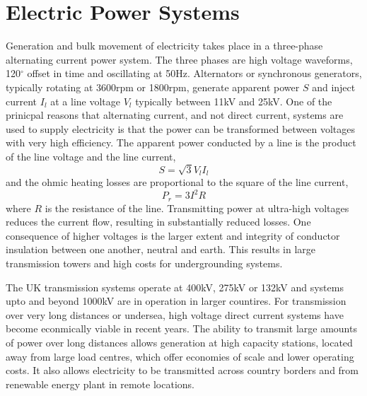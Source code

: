 \section{Electric Power Systems}
Generation and bulk movement of electricity takes place in a three-phase
alternating current power system.  The three phases are high voltage waveforms,
120$^\circ$ offset in time and oscillating at 50Hz.  Alternators or synchronous
generators, typically rotating at 3600rpm or 1800rpm, generate apparent power
$S$ and inject current $I_l$ at a line voltage $V_l$ typically between 11kV and
25kV.  One of the prinicpal reasons that alternating current, and not direct
current, systems are used to supply electricity is that the power can be
transformed between voltages with very high efficiency.  The apparent power
conducted by a line is the product of the line voltage and the line current,
\begin{equation}
S = \sqrt{3} V_l I_l
\end{equation}
and the ohmic heating losses are proportional to the square of the line
current,
\begin{equation}
P_{r} = 3 I^2 R
\end{equation}
where $R$ is the resistance of the line.  Transmitting power at ultra-high
voltages reduces the current flow, resulting in substantially reduced losses.
One consequence of higher voltages is the larger extent and integrity
of conductor insulation between one another, neutral and earth.  This results
in large transmission towers and high costs for undergrounding systems.

The UK transmission systems operate at 400kV, 275kV or 132kV and systems upto
and beyond 1000kV are in operation in larger countires.  For transmission over
very long distances or undersea, high voltage direct current systems have
become econmically viable in recent years.  The ability to transmit large
amounts of power over long distances allows generation at high capacity
stations, located away from large load centres, which offer economies of scale
and lower operating costs.  It also allows electricity to be transmitted
across country borders and from renewable energy plant in remote locations.

